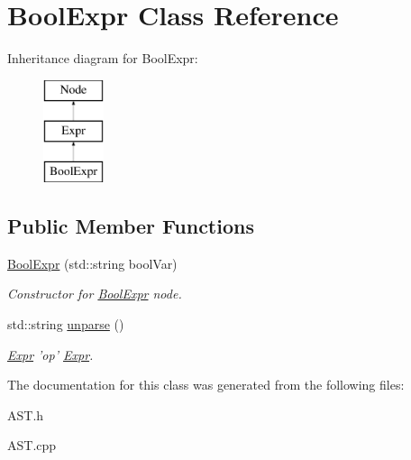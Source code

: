\hypertarget{classBoolExpr}{\section{Bool\-Expr Class Reference}
\label{classBoolExpr}
}
Inheritance diagram for Bool\-Expr\-:\begin{figure}[H]
\begin{center}
\leavevmode
\includegraphics[height=3.000000cm]{classBoolExpr}
\end{center}
\end{figure}
\subsection*{Public Member Functions}
\begin{DoxyCompactItemize}
\item 
\hypertarget{classBoolExpr_ad3c1ad52e4a8152e56a27548f655a06f}{\hyperlink{classBoolExpr_ad3c1ad52e4a8152e56a27548f655a06f}{Bool\-Expr} (std\-::string bool\-Var)}\label{classBoolExpr_ad3c1ad52e4a8152e56a27548f655a06f}

\begin{DoxyCompactList}\small\item\em Constructor for \hyperlink{classBoolExpr}{Bool\-Expr} node. \end{DoxyCompactList}\item 
\hypertarget{classBoolExpr_a71c1485b0a9729f6ae7148597d15feb3}{std\-::string \hyperlink{classBoolExpr_a71c1485b0a9729f6ae7148597d15feb3}{unparse} ()}\label{classBoolExpr_a71c1485b0a9729f6ae7148597d15feb3}

\begin{DoxyCompactList}\small\item\em \hyperlink{classExpr}{Expr} 'op' \hyperlink{classExpr}{Expr}. \end{DoxyCompactList}\end{DoxyCompactItemize}


The documentation for this class was generated from the following files\-:\begin{DoxyCompactItemize}
\item 
A\-S\-T.\-h\item 
A\-S\-T.\-cpp\end{DoxyCompactItemize}
